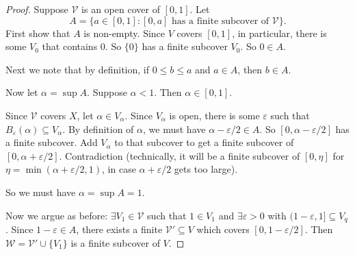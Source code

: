 \documentclass[a4paper]{article}
\begin{document}
\begin{proof}
  Suppose $\mathcal{V}$ is an open cover of $[0, 1]$. Let
  \[
    A = \{a\in [0, 1]: [0, a] \text{ has a finite subcover of }\mathcal{V}\}.
  \]
  First show that $A$ is non-empty. Since $V$ covers $[0, 1]$, in particular, there is some $V_0$ that contains $0$. So $\{0\}$ has a finite subcover $V_0$. So $0\in A$.

  Next we note that by definition, if $0\leq b \leq a$ and $a\in A$, then $b\in A$.

  Now let $\alpha = \sup A$. Suppose $\alpha < 1$. Then $\alpha \in [0, 1]$.

  Since $\mathcal{V}$ covers $X$, let $\alpha \in V_\alpha$. Since $V_\alpha$ is open, there is some $\varepsilon$ such that $B_\varepsilon(\alpha) \subseteq V_\alpha$. By definition of $\alpha$, we must have $\alpha - \varepsilon/2\in A$. So $[0, \alpha - \varepsilon/2]$ has a finite subcover. Add $V_\alpha$ to that subcover to get a finite subcover of $[0, \alpha + \varepsilon/2]$. Contradiction (technically, it will be a finite subcover of $[0, \eta]$ for $\eta = \min(\alpha + \varepsilon/2, 1)$, in case $\alpha + \varepsilon/2$ gets too large).

  So we must have $\alpha = \sup A = 1$.

  Now we argue as before: $\exists V_1 \in \mathcal{V}$ such that $1 \in V_1$ and $\exists \varepsilon > 0$ with $(1 - \varepsilon, 1] \subseteq V_q$. Since $1 - \varepsilon \in A$, there exists a finite $\mathcal{V}' \subseteq V$ which covers $[0, 1 - \varepsilon/2]$. Then $\mathcal{W} = \mathcal{V}' \cup \{V_1\}$ is a finite subcover of $V$.
\end{proof}
\end{document}
